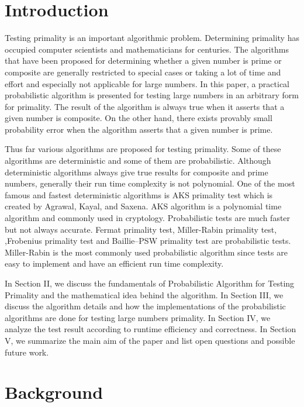 \documentclass[conference]{IEEEtran}
\begin{document}
\section{Introduction}
Testing primality is an important algorithmic problem. Determining primality has occupied computer scientists and mathematicians for centuries. The algorithms that have been proposed for determining whether a given number is prime or composite are generally restricted to special cases or taking a lot of time and effort and especially not applicable for large numbers. In this paper, a practical probabilistic algorithm is presented for testing large numbers in an arbitrary form for primality. The result of the algorithm is always true when it asserts that a given number is composite. On the other hand, there exists provably small probability error when the algorithm asserts that a given number is prime. 

Thus far various algorithms are proposed for testing primality. Some of these algorithms are deterministic and some of them are probabilistic. Although deterministic algorithms always give true results for composite and prime numbers, generally their run time complexity is not polynomial. One of the most famous and fastest deterministic algorithms is AKS primality test which is created by Agrawal, Kayal, and Saxena. AKS algorithm is a polynomial time algorithm and commonly used in cryptology. Probabilistic tests are much faster but not always accurate. Fermat primality test, Miller-Rabin primality test, ,Frobenius primality test and Baillie–PSW primality test are probabilistic tests. Miller-Rabin is the most commonly used probabilistic algorithm since  tests are easy to implement and have an efficient run time complexity. 

In Section II, we discuss the fundamentals of Probabilistic Algorithm for Testing Primality and the mathematical idea behind the algorithm.  In Section III, we discuss the algorithm details and how the implementations of the probabilistic algorithms are done for testing large numbers primality. In Section IV, we analyze the test result according to runtime efficiency and correctness. In Section V, we summarize the main aim of the paper and list  open questions and possible future work.





\section{Background}
\end{document}
